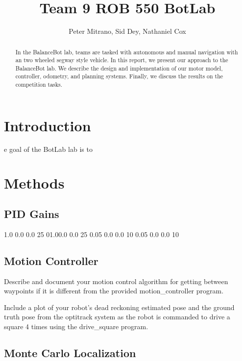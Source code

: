 \documentclass[journal]{IEEEtran}
\begin{document}
\title{Team 9 ROB 550 BotLab}

\author{Peter Mitrano, Sid Dey, Nathaniel Cox}

\maketitle

\begin{abstract}
In the BalanceBot lab, teams are tasked with autonomous and manual navigation with an two wheeled segway style vehicle. In this report, we present our approach to the BalanceBot lab. We describe the design and implementation of our motor model, controller, odometry, and planning systems. Finally, we discuss the results on the competition tasks.
\end{abstract}
\IEEEpeerreviewmaketitle

\section{Introduction}
e goal of the BotLab lab is to 

\section{Methods}

\subsection{PID Gains}

1.0 0.0 0.0 25
01.00.0 0.0 25
0.05 0.0 0.0 10
0.05 0.0 0.0 10

\subsection{Motion Controller}

Describe and document your motion control algorithm for getting between waypoints if it is different from the provided motion\_controller program.

Include a plot of your robot’s dead reckoning estimated pose and the ground truth pose from the optitrack system as the robot is commanded to drive a square 4 times using the drive\_square program.

\subsection{Monte Carlo Localization}
\end{document}
